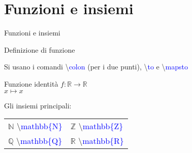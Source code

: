 \section{Funzioni e insiemi}
  \begin{frame}{Funzioni e insiemi}

	Definizione di funzione

	Si usano i comandi \textbackslash \textcolor{blue}{colon} (per i due punti), \textbackslash \textcolor{blue}{to} e \textbackslash \textcolor{blue}{mapsto}

    \begin{exampleblock}{Funzione identità}
	  \centering
	  $f \colon \mathbb{R} \to \mathbb{R}$ \\
	  $x \mapsto x$
    \end{exampleblock}

	Gli insiemi principali:

	\begin{table}[h!]
	\begin{tabular}{l l}
	\hline
	$\mathbb{N}$ \textbackslash \textcolor{blue}{mathbb\{N\}} & $\mathbb{Z}$ \textbackslash \textcolor{blue}{mathbb\{Z\}} \\
	$\mathbb{Q}$ \textbackslash \textcolor{blue}{mathbb\{Q\}} & $\mathbb{R}$ \textbackslash \textcolor{blue}{mathbb\{R\}} \\
	\hline
	\end{tabular}
	\end{table}

\end{frame}
